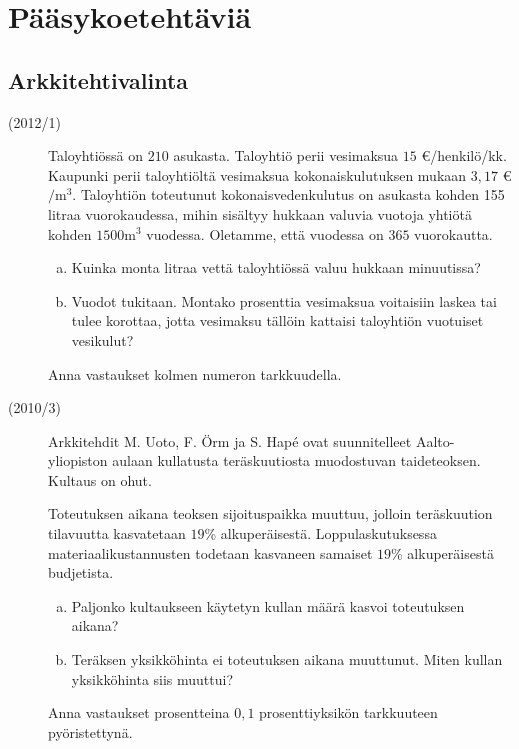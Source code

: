 \chapter{Pääsykoetehtäviä}

\section{Arkkitehtivalinta}

\begin{description}
    \item[(2012/1)] Taloyhtiössä on $210$ asukasta. Taloyhtiö perii vesimaksua
        $15$ \euro/henkilö/kk. Kaupunki perii taloyhtiöltä vesimaksua
        kokonaiskulutuksen mukaan $3,17$ \euro $/ \mathrm{m}^3$.
        Taloyhtiön toteutunut kokonaisvedenkulutus on asukasta kohden
        155 litraa vuorokaudessa, mihin sisältyy hukkaan valuvia
        vuotoja yhtiötä kohden $1500 \mathrm{m}^3$ vuodessa. Oletamme,
        että vuodessa on $365$ vuorokautta.
                    
    \begin{enumerate}[(a)]
        \item Kuinka monta litraa vettä taloyhtiössä valuu hukkaan minuutissa?
        \item Vuodot tukitaan. Montako prosenttia vesimaksua voitaisiin laskea
            tai tulee korottaa, jotta vesimaksu tällöin kattaisi taloyhtiön
            vuotuiset vesikulut?
    \end{enumerate}
    
    Anna vastaukset kolmen numeron tarkkuudella.
\end{description}


\begin{description}
    \item[(2010/3)] Arkkitehdit M. Uoto, F. Örm ja S. Hapé ovat suunnitelleet Aalto-yliopiston aulaan kullatusta teräskuutiosta muodostuvan taideteoksen. Kultaus on ohut.
    
    Toteutuksen aikana teoksen sijoituspaikka muuttuu, jolloin teräskuution tilavuutta kasvatetaan $19$\% alkuperäisestä. Loppulaskutuksessa materiaalikustannusten todetaan kasvaneen samaiset $19$\% alkuperäisestä budjetista.                   
    \begin{enumerate}[(a)]
        \item Paljonko kultaukseen käytetyn kullan määrä kasvoi toteutuksen aikana?
        \item Teräksen yksikköhinta ei toteutuksen aikana muuttunut. Miten kullan yksikköhinta siis muuttui?
    \end{enumerate}
    
    Anna vastaukset prosentteina $0,1$ prosenttiyksikön tarkkuuteen pyöristettynä.
\end{description}


